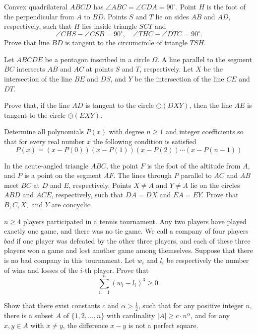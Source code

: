 \documentclass[11pt]{scrartcl}
\begin{document}
\begin{problem}[5841938333292270043]
Convex quadrilateral $ABCD$ has $\angle ABC = \angle CDA = 90^{\circ}$. Point $H$ is the foot of the perpendicular from $A$ to $BD$. Points $S$ and $T$ lie on sides $AB$ and $AD$, respectively, such that $H$ lies inside triangle $SCT$ and\[
\angle CHS - \angle CSB = 90^{\circ}, \quad \angle THC - \angle DTC = 90^{\circ}. \]Prove that line $BD$ is tangent to the circumcircle of triangle $TSH$.
\end{problem}
\begin{problem}[5867489266334805897]
	Let $ABCDE$ be a pentagon inscribed in a circle $\Omega$. A line parallel to the segment $BC$ intersects $AB$ and $AC$ at points $S$ and $T$, respectively. Let $X$ be the intersection of the line $BE$ and $DS$, and $Y$ be the intersection of the line $CE$ and $DT$.

Prove that, if the line $AD$ is tangent to the circle $\odot(DXY)$, then the line $AE$ is tangent to the circle $\odot(EXY)$.
\end{problem}
\begin{problem}[5871948911817167044]
Determine all polynomials $P(x)$ with degree $n\geq 1$ and integer coefficients so that for every real number $x$ the following condition is satisfied
$$P(x)=(x-P(0))(x-P(1))(x-P(2))\cdots (x-P(n-1))$$
\end{problem}
\begin{problem}[5873161915777778529]
In the acute-angled triangle $ABC$, the point $F$ is the foot of the altitude from $A$, and $P$ is a point on the segment $AF$. The lines through $P$ parallel to $AC$ and $AB$ meet $BC$ at $D$ and $E$, respectively. Points $X \ne A$ and $Y \ne A$ lie on the circles $ABD$ and $ACE$, respectively, such that $DA = DX$ and $EA = EY$.
Prove that $B, C, X,$ and $Y$ are concyclic.
\end{problem}
\begin{problem}[5886572081531632011]
	$n \geq 4$ players participated in a tennis tournament. Any two players have played exactly one game, and there was no tie game. We call a company of four players $bad$ if one player was defeated by the other three players, and each of these three players won a game and lost another game among themselves. Suppose that there is no bad company in this tournament. Let $w_i$ and $l_i$ be respectively the number of wins and losses of the $i$-th player. Prove that\[\sum^n_{i=1} \left(w_i - l_i\right)^3 \geq 0.\]
\end{problem}
\begin{problem}[5887099797146292006]
Show that there exist constants $c$ and $\alpha > \frac{1}{2}$, such that for any positive integer $n$, there is a subset $A$ of $\{1,2,\ldots,n\}$ with cardinality $|A| \ge c \cdot n^\alpha$, and for any $x,y \in A$ with $x \neq y$, the difference $x-y$ is not a perfect square.
\end{problem}
\end{document}
